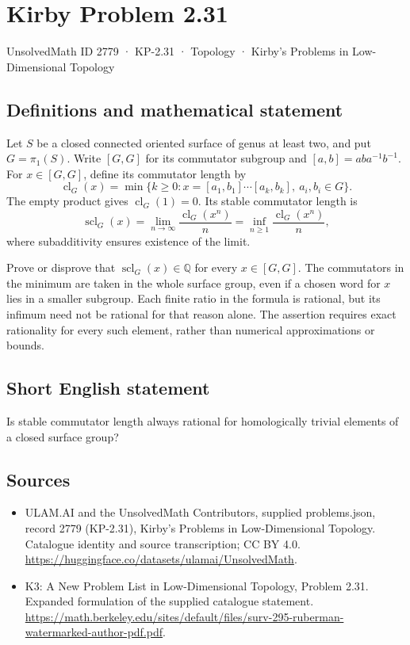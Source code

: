 \documentclass[11pt,a4paper]{article}
\begin{document}
\section*{Kirby Problem 2.31}\label{2779}
{\small UnsolvedMath ID 2779 · KP-2.31 · Topology · Kirby's Problems in Low-Dimensional Topology}
\subsection{Definitions and mathematical statement}
Let $S$ be a closed connected oriented surface of genus at least two, and put
$G=\pi_1(S)$. Write $[G,G]$ for its commutator subgroup and
$[a,b]=aba^{-1}b^{-1}$. For $x\in[G,G]$, define its commutator length by
\[
\operatorname{cl}_G(x)=\min\{k\geq0:x=[a_1,b_1]\cdots[a_k,b_k],\ a_i,b_i\in G\}.
\]
The empty product gives $\operatorname{cl}_G(1)=0$.
Its stable commutator length is
\[
\operatorname{scl}_G(x)=\lim_{n\to\infty}
\frac{\operatorname{cl}_G(x^n)}n
=\inf_{n\geq1}\frac{\operatorname{cl}_G(x^n)}n,
\]
where subadditivity ensures existence of the limit.

Prove or disprove that $\operatorname{scl}_G(x)\in\mathbb Q$ for every
$x\in[G,G]$. The commutators in the minimum are taken in the whole surface
group, even if a chosen word for $x$ lies in a smaller subgroup. Each finite
ratio in the formula is rational, but its infimum need not be rational for
that reason alone. The assertion requires exact rationality for every such
element, rather than numerical approximations or bounds.
\subsection{Short English statement}
Is stable commutator length always rational for homologically trivial elements of a closed surface group?
\subsection{Sources}
\begin{itemize}
\item[S1] ULAM.AI and the UnsolvedMath Contributors, supplied problems.json, record 2779 (KP-2.31), Kirby's Problems in Low-Dimensional Topology. Catalogue identity and source transcription; CC BY 4.0.
\url{https://huggingface.co/datasets/ulamai/UnsolvedMath}.
\item[S2] K3: A New Problem List in Low-Dimensional Topology, Problem 2.31. Expanded formulation of the supplied catalogue statement.
\url{https://math.berkeley.edu/sites/default/files/surv-295-ruberman-watermarked-author-pdf.pdf}.
\end{itemize}
\end{document}
